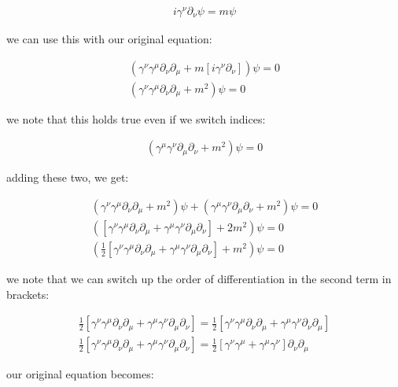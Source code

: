 \documentclass[11pt]{article}
\theoremstyle{definition}
\begin{document}
\begin{align*}
    i \gamma^{\nu}\partial_{\nu}\psi = m\psi
\end{align*}

we can use this with our original equation:

\begin{align*}
    (\gamma^{\nu}\gamma^{\mu} \partial_{\nu}\partial_{\mu} +m[i\gamma^{\nu} \partial_{\nu}])\psi = 0\\
    (\gamma^{\nu}\gamma^{\mu} \partial_{\nu}\partial_{\mu} + m^2)\psi = 0
\end{align*}

we note that this holds true even if we switch indices:

\begin{align*}
    (\gamma^{\mu}\gamma^{\nu} \partial_{\mu}\partial_{\nu} + m^2)\psi = 0
\end{align*}

adding these two, we get:

\begin{align*}
    (\gamma^{\nu}\gamma^{\mu} \partial_{\nu}\partial_{\mu} + m^2)\psi + (\gamma^{\mu}\gamma^{\nu} \partial_{\mu}\partial_{\nu} + m^2)\psi = 0 \\
    (\left[\gamma^{\nu}\gamma^{\mu} \partial_{\nu}\partial_{\mu} + \gamma^{\mu}\gamma^{\nu}\partial_{\mu}\partial_{\nu}\right] + 2m^2)\psi =0\\
    \left( \frac{1}{2}\left[\gamma^{\nu}\gamma^{\mu} \partial_{\nu}\partial_{\mu} + \gamma^{\mu}\gamma^{\nu}\partial_{\mu}\partial_{\nu}\right] + m^2 \right)\psi =0
\end{align*}

we note that we can switch up the order of differentiation in the second term in brackets:

\begin{align*}
    \frac{1}{2}\left[\gamma^{\nu}\gamma^{\mu} \partial_{\nu}\partial_{\mu} + \gamma^{\mu}\gamma^{\nu}\partial_{\mu}\partial_{\nu}\right] = 
    \frac{1}{2}\left[\gamma^{\nu}\gamma^{\mu} \partial_{\nu}\partial_{\mu} + \gamma^{\mu}\gamma^{\nu}\partial_{\nu}\partial_{\mu}\right]\\
    \frac{1}{2}\left[\gamma^{\nu}\gamma^{\mu} \partial_{\nu}\partial_{\mu} + \gamma^{\mu}\gamma^{\nu}\partial_{\mu}\partial_{\nu}\right]=  
    \frac{1}{2}\left[\gamma^{\nu}\gamma^{\mu}  + \gamma^{\mu}\gamma^{\nu}\right]\partial_{\nu}\partial_{\mu}
\end{align*}

our original equation becomes:
\end{document}
